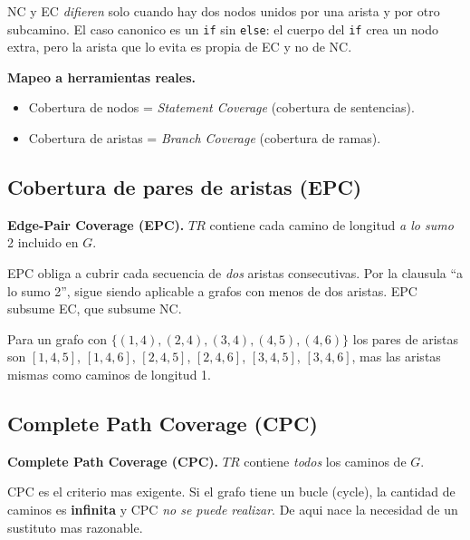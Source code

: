 \documentclass[12pt,a4paper]{article}
\begin{document}
\begin{ideabox}
NC y EC \emph{difieren} solo cuando hay dos nodos unidos por una arista y por otro subcamino. El
caso canonico es un \texttt{if} sin \texttt{else}: el cuerpo del \texttt{if} crea un nodo extra,
pero la arista que lo evita es propia de EC y no de NC.
\end{ideabox}

\textbf{Mapeo a herramientas reales.}
\begin{itemize}
  \item Cobertura de nodos = \textit{Statement Coverage} (cobertura de sentencias).
  \item Cobertura de aristas = \textit{Branch Coverage} (cobertura de ramas).
\end{itemize}

\subsection{Cobertura de pares de aristas (EPC)}

\begin{definicionbox}
\textbf{Edge-Pair Coverage (EPC).} $TR$ contiene cada camino de longitud \emph{a lo sumo} 2
incluido en $G$.
\end{definicionbox}

EPC obliga a cubrir cada secuencia de \emph{dos} aristas consecutivas. Por la clausula ``a lo
sumo 2'', sigue siendo aplicable a grafos con menos de dos aristas. EPC subsume EC, que subsume
NC.

\begin{ejemplobox}
Para un grafo con $\{(1,4),(2,4),(3,4),(4,5),(4,6)\}$ los pares de aristas son
$[1,4,5]$, $[1,4,6]$, $[2,4,5]$, $[2,4,6]$, $[3,4,5]$, $[3,4,6]$, mas las aristas mismas como
caminos de longitud 1.
\end{ejemplobox}

\subsection{Complete Path Coverage (CPC)}

\begin{definicionbox}
\textbf{Complete Path Coverage (CPC).} $TR$ contiene \emph{todos} los caminos de $G$.
\end{definicionbox}

CPC es el criterio mas exigente. Si el grafo tiene un bucle (cycle), la cantidad de caminos es
\textbf{infinita} y CPC \emph{no se puede realizar}. De aqui nace la necesidad de un sustituto
mas razonable.
\end{document}

